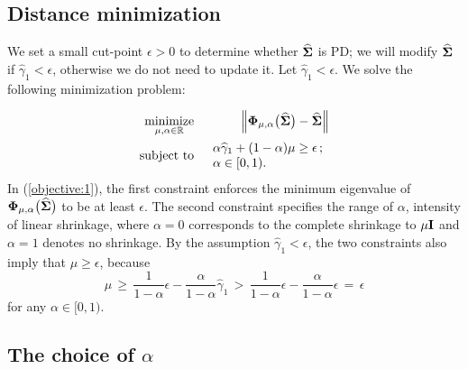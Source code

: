 \documentclass[times,sort&compress,3p]{elsarticle}
\newcommand{\MB}{\mathbb}
\newcommand{\NN}{\nonumber}
\newcommand{\minimize}{\mathop{\rm minimize}}
\newcommand{\subjectto}{\mathop{\rm subject~to}}
\begin{document}
\subsection{Distance minimization}\label{subsec:distance}

We set a small cut-point $\epsilon > 0$ to determine whether $\widehat{\bf \Sigma}$ is PD; we will modify $\widehat{\bf \Sigma}$ if $\widehat{\gamma}_{1} < \epsilon$, otherwise we do not need to update it.
Let $\widehat{\gamma}_{1} < \epsilon$. We solve the following minimization problem:

\begin{eqnarray}
\minimize_{\mu, \alpha \in \MB{R}} &&
	\left\| {\bf \Phi}_{\mu, \alpha}\big(\widehat{\bf \Sigma}\big)
	- \widehat{\bf \Sigma} \right\| \label{objective:1} \\
\subjectto &&
	\begin{array}{l}
  	\alpha \widehat{\gamma}_1 + (1 - \alpha) \mu \geq \epsilon \, ; \\
  	\alpha \in [0,1).	
	\end{array} \NN
\end{eqnarray}
%
In (\ref{objective:1}), the first constraint enforces the minimum eigenvalue of ${\bf \Phi}_{\mu, \alpha}\big(\widehat{\bf \Sigma}\big)$ to be at least $\epsilon$. The second constraint specifies the range of $\alpha$, intensity of linear shrinkage, where $\alpha=0$ corresponds to the complete shrinkage to $\mu {\bf I}$  and $\alpha=1$ denotes no shrinkage.
 By the assumption $\widehat{\gamma}_{1} < \epsilon$, the two constraints also imply that $\mu \geq \epsilon$, because
\[
\mu \,\geq\,
	\frac{1}{1-\alpha} \epsilon - \frac{\alpha}{1-\alpha} \widehat{\gamma}_{1}
    \,>\, \frac{1}{1-\alpha} \epsilon - \frac{\alpha}{1-\alpha} \epsilon
    \,=\, \epsilon
\]
for any $\alpha \in [0,1)$.



\subsection{The choice of $\alpha$}\label{subsec:alpha}
\end{document}
